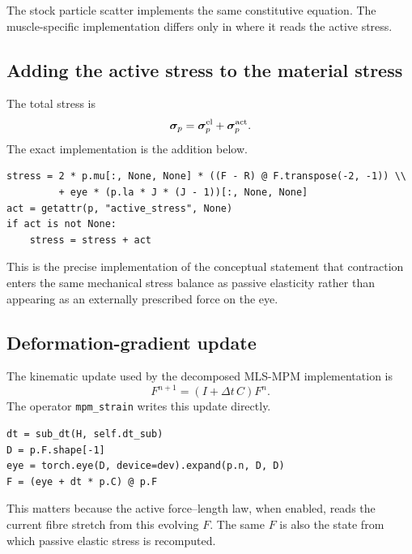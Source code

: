 \documentclass[11pt]{article}
\begin{document}
The stock particle scatter implements the same constitutive equation. The muscle-specific implementation differs only in where it reads the active stress.

\subsection{Adding the active stress to the material stress}

The total stress is
\begin{equation}
\boldsymbol{\sigma}_p
=
\boldsymbol{\sigma}^{\rm el}_p
+
\boldsymbol{\sigma}^{\rm act}_p.
\label{eq:auto29}
\end{equation}
The exact implementation is the addition below.

\begin{lstlisting}[caption={\texttt{prototype/eye/muscle\_ops.py}: active stress is added before momentum scatter.},label={lst:stress-sum-code}]
stress = 2 * p.mu[:, None, None] * ((F - R) @ F.transpose(-2, -1)) \\
         + eye * (p.la * J * (J - 1))[:, None, None]
act = getattr(p, "active_stress", None)
if act is not None:
    stress = stress + act
\end{lstlisting}

This is the precise implementation of the conceptual statement that contraction enters the same mechanical stress balance as passive elasticity rather than appearing as an externally prescribed force on the eye.

\subsection{Deformation-gradient update}

The kinematic update used by the decomposed MLS-MPM implementation is
\begin{equation}
F^{n+1}=(I+\Delta t\,C)F^n.
\label{eq:auto30}
\end{equation}
The operator \texttt{mpm\_strain} writes this update directly.

\begin{lstlisting}[caption={\texttt{src/plexus/operators/mpm\_strain.py}: deformation-gradient update.},label={lst:F-update-code}]
dt = sub_dt(H, self.dt_sub)
D = p.F.shape[-1]
eye = torch.eye(D, device=dev).expand(p.n, D, D)
F = (eye + dt * p.C) @ p.F
\end{lstlisting}

This matters because the active force--length law, when enabled, reads the current fibre stretch from this evolving $F$. The same $F$ is also the state from which passive elastic stress is recomputed.
\end{document}
